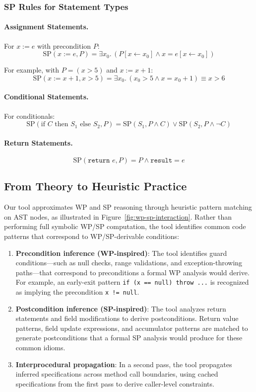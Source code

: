 \subsubsection{SP Rules for Statement Types}

\paragraph{Assignment Statements.}
For $x := e$ with precondition $P$:
\[
\text{SP}(x := e, P) = \exists x_0.\, (P[x \leftarrow x_0] \land x = e[x \leftarrow x_0])
\]

For example, with $P = (x > 5)$ and $x := x + 1$:
\[
\text{SP}(x := x + 1, x > 5) = \exists x_0.\, (x_0 > 5 \land x = x_0 + 1) \equiv x > 6
\]

\paragraph{Conditional Statements.}
For conditionals:
\[
\text{SP}(\text{if } C \text{ then } S_1 \text{ else } S_2, P) = \text{SP}(S_1, P \land C) \lor \text{SP}(S_2, P \land \neg C)
\]

\paragraph{Return Statements.}
\[
\text{SP}(\texttt{return } e, P) = P \land \texttt{result} = e
\]

\subsection{From Theory to Heuristic Practice}
\label{subsec:wp-sp-interaction}

Our tool approximates WP and SP reasoning through heuristic pattern matching on AST nodes, as illustrated in Figure~\ref{fig:wp-sp-interaction}. Rather than performing full symbolic WP/SP computation, the tool identifies common code patterns that correspond to WP/SP-derivable conditions:

\begin{enumerate}
    \item \textbf{Precondition inference (WP-inspired)}: The tool identifies guard conditions---such as null checks, range validations, and exception-throwing paths---that correspond to preconditions a formal WP analysis would derive. For example, an early-exit pattern \texttt{if (x == null) throw ...} is recognized as implying the precondition \texttt{x != null}.

    \item \textbf{Postcondition inference (SP-inspired)}: The tool analyzes return statements and field modifications to derive postconditions. Return value patterns, field update expressions, and accumulator patterns are matched to generate postconditions that a formal SP analysis would produce for these common idioms.

    \item \textbf{Interprocedural propagation}: In a second pass, the tool propagates inferred specifications across method call boundaries, using cached specifications from the first pass to derive caller-level constraints.
\end{enumerate}

